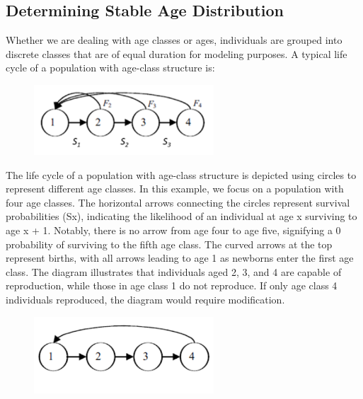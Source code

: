 \documentclass[12pt]{article}
\begin{document}
\subsection{
Determining Stable Age Distribution}
Whether we are dealing with age classes or ages, individuals are grouped into discrete classes that are of equal duration for modeling purposes. A typical life cycle of a population with age-class structure is:
\begin{figure}[H]
  \centering
  \includegraphics[width=0.6\textwidth]{birthtodeath.png}
\end{figure}
The life cycle of a population with age-class structure is depicted using circles to represent different age classes. In this example, we focus on a population with four age classes. The horizontal arrows connecting the circles represent survival probabilities (Sx), indicating the likelihood of an individual at age x surviving to age x + 1. Notably, there is no arrow from age four to age five, signifying a 0 probability of surviving to the fifth age class. The curved arrows at the top represent births, with all arrows leading to age 1 as newborns enter the first age class. The diagram illustrates that individuals aged 2, 3, and 4 are capable of reproduction, while those in age class 1 do not reproduce. If only age class 4 individuals reproduced, the diagram would require modification.
\begin{figure}[H]
  \centering
  \includegraphics[width=0.6\textwidth]{modifiedbirthtodeath.png}
\end{figure}
\end{document}
